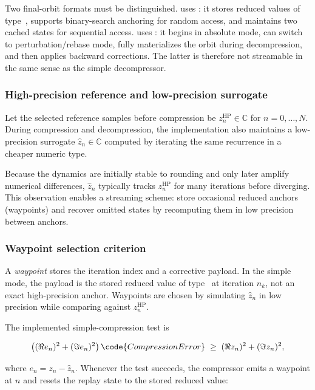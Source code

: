Two final-orbit formats must be distinguished.   uses
: it stores reduced values of type~, supports
binary-search anchoring for random access, and maintains two cached states for
sequential access.   uses : it begins in
absolute mode, can switch to perturbation/rebase mode, fully materializes the
orbit during decompression, and then applies backward corrections.  The latter
is therefore not streamable in the same sense as the simple decompressor.

\subsubsection{High-precision reference and low-precision surrogate}
Let the selected reference samples before compression be
\(
z_n^{\mathrm{HP}} \in \mathbb{C}
\)
for \(n=0,\dots,N\).
During compression and decompression, the implementation also maintains a low-precision surrogate
\(
\hat z_n \in \mathbb{C}
\)
computed by iterating the same recurrence in a cheaper numeric type.

Because the dynamics are initially stable to rounding and only later amplify
numerical differences, \(\hat z_n\) typically tracks \(z_n^{\mathrm{HP}}\) for
many iterations before diverging.  This observation enables a streaming scheme:
store occasional reduced anchors (waypoints) and recover omitted states by
recomputing them in low precision between anchors.

\subsubsection{Waypoint selection criterion}
A \emph{waypoint} stores the iteration index and a corrective payload.
In the simple mode, the payload is the stored reduced value of type~ at
iteration \(n_k\), not an exact high-precision anchor.
Waypoints are chosen by simulating \(\hat z_n\) in low precision while comparing
against \(z_n^{\mathrm{HP}}\).

The implemented simple-compression test is

\begin{equation}
  \left((\Re e_n)^2+(\Im e_n)^2\right)
  \code{CompressionError}
  \;\ge\; (\Re z_n)^2+(\Im z_n)^2,
  \label{eq:relerr-test}
\end{equation}

where $e_n=z_n-\hat z_n$.  Whenever the test succeeds, the compressor emits a
waypoint at \(n\) and resets the replay state to the stored reduced value:


